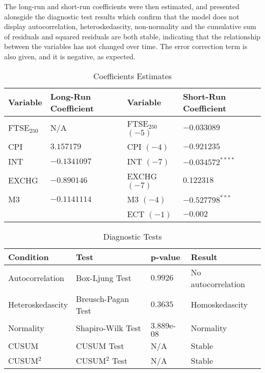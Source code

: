\documentclass[12pt,a4paper]{article}
\begin{document}
The long-run and short-run coefficients were then estimated, and presented 
alonsgide the diagnostic test results which confirm that the model does not
display autocorrelation, heteroskedascity, non-normality and the cumulative 
sum of residuals and squared residuals are both stable, indicating that the 
relationship between the variables has not changed over time. The error
correction term is also given, and it is negative, as expected.

\begin{table}[h!]
    \centering
    \caption{Coefficients Estimates}
    \begin{tabular}{llll}
        \toprule
        \textbf{Variable} & \textbf{Long-Run Coefficient} & \textbf{Variable} & \textbf{Short-Run Coefficient} \\
        \midrule
        FTSE$_{250}$ & N/A & FTSE$_{250}$ $(-5)$  & $-0.033089$ \\
        CPI & $3.157179$ & CPI $(-4)$ & $-0.921235$ \\
        INT & $-0.1341097$ & INT $(-7)$ & $-0.034572^{****}$\\
        EXCHG &  $-0.890146$ & EXCHG $(-7)$ & $0.122318$ \\
        M3 & $-0.1141114$ & M3 $(-4)$ & $-0.527798^{***}$ \\
         & & ECT $(-1)$ & $-0.002$ \\
        \bottomrule
    \end{tabular}
\end{table}

\begin{table}[h!]
    \centering
    \caption{Diagnostic Tests}
    \begin{tabular}{llll}
        \toprule
        \textbf{Condition} & \textbf{Test} & \textbf{p-value} & \textbf{Result} \\
        \midrule
        Autocorrelation & Box-Ljung Test & $0.9926$ & No autocorrelation \\
        Heteroskedascity & Breusch-Pagan Test & $0.3635$ & Homoskedascity \\
        Normality & Shapiro-Wilk Test & $3.889$e-$08$ & Normality \\
        CUSUM & CUSUM Test & N/A & Stable \\
        CUSUM$^2$ & CUSUM$^2$ Test & N/A & Stable \\
        \bottomrule
    \end{tabular}
\end{table}
\end{document}
